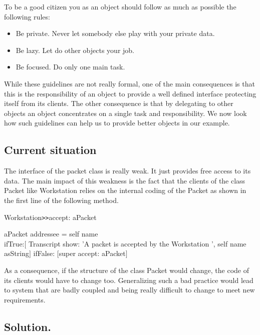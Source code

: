 To be a good citizen you as an object should follow as much as 
possible the following rules:

\begin{itemize}
\item
Be private. Never let somebody else play with your private data.
\item
Be lazy. Let do other objects your job.
\item
Be focused. Do only one main task. 
\end{itemize}

While these guidelines are not really formal, one of the main 
consequences is that this is the responsibility of an object 
to provide a well defined interface protecting itself from its 
clients. The other consequence is that by delegating to other 
objects an object concentrates on a single task and responsibility. 
We now look how such guidelines can help us to provide better 
objects in our example.



\subsection{Current situation}

The interface of the packet class is really weak. It just provides 
free access to its data. The main impact of this weakness is 
the fact that the clients of the class Packet like Workstation relies 
on the internal coding of the Packet as shown in the first line 
of the following method.

\begin{code}
Workstation\texttt{>>}accept: aPacket

    aPacket addressee = self name\\
       ifTrue:\ensuremath{[} Transcript show: 'A packet is accepted by the Workstation ', self name asString\ensuremath{]}
       ifFalse: \ensuremath{[}super accept: aPacket\ensuremath{]}
\end{code}

As a consequence, if the structure of the class Packet would 
change, the code of its clients would have to change too. Generalizing 
such a bad practice would lead to system that are badly coupled 
and being really difficult to change to meet new requirements.



\subsection{Solution.}

